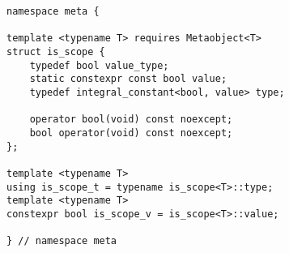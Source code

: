 
\begin{verbatim}
namespace meta {

template <typename T> requires Metaobject<T>
struct is_scope {
	typedef bool value_type;
	static constexpr const bool value;
	typedef integral_constant<bool, value> type;

	operator bool(void) const noexcept;
	bool operator(void) const noexcept;
};

template <typename T>
using is_scope_t = typename is_scope<T>::type;
template <typename T>
constexpr bool is_scope_v = is_scope<T>::value;

} // namespace meta
\end{verbatim}
